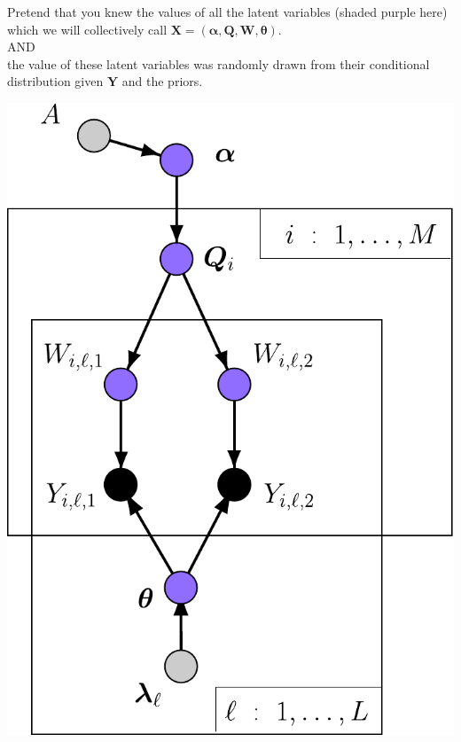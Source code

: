 \begin{minipage}{.47\textwidth}
Pretend that you knew the values of all the latent variables (shaded purple here) which we will collectively call $\mathbf{X} = (\bm{\alpha}, \bm{Q},\mathbf{W}, \bm{\theta})$.
\\

 AND 
 \\
 
the value of these latent variables was randomly drawn from their conditional distribution given $\mathbf{Y}$ and the priors.
\end{minipage}
\hfill
\begin{minipage}{.51\textwidth}
\vfill
\hfill\includegraphics*[width=.95\textwidth]{illus/PritchSimple2_purp.pdf}
\vfill
\end{minipage}


